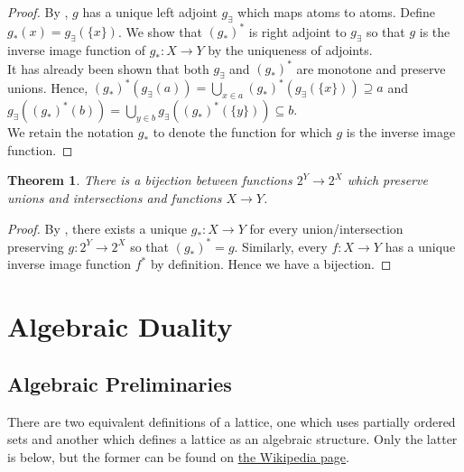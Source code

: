 \documentclass{article}
\newtheorem{theorem}[proposition]{Theorem}
\begin{document}
\begin{proof}
By , $g$ has a unique left adjoint $g_\exists$ which maps atoms to atoms. Define $g_*(x) = g_\exists(\{x\})$. We show that $(g_*)^*$ is right adjoint to $g_\exists$ so that $g$ is the inverse image function of $g_* : X \to Y$ by the uniqueness of adjoints. \\

It has already been shown that both $g_\exists$ and $(g_*)^*$ are monotone and preserve unions. Hence, $(g_*)^*(g_\exists(a)) = \bigcup_{x \in a} (g_*)^*(g_\exists(\{x\})) \supseteq a$ and $g_\exists((g_*)^*(b)) = \bigcup_{y \in b} g_\exists((g_*)^*(\{y\})) \subseteq b$. \\

We retain the notation $g_*$ to denote the function for which $g$ is the inverse image function. 
\end{proof}

\begin{theorem} \label{thm:bijection-set-morphisms-to-powset-morphisms}
There is a bijection between functions $2^Y \to 2^X$ which preserve unions and intersections and functions $X \to Y$.
\end{theorem}

\begin{proof}
By , there exists a unique $g_* : X \to Y$ for every union/intersection preserving $g : 2^Y \to 2^X$ so that $(g_*)^* = g$. Similarly, every $f : X \to Y$ has a unique inverse image function $f^*$ by definition. Hence we have a bijection.
\end{proof}

\pagebreak


\section{Algebraic Duality}

\subsection{Algebraic Preliminaries}

There are two equivalent definitions of a lattice, one which uses partially ordered sets and another which defines a lattice as an algebraic structure. Only the latter is below, but the former can be found on \href{https://en.wikipedia.org/wiki/Lattice_(order)}{the Wikipedia page}.
\end{document}
